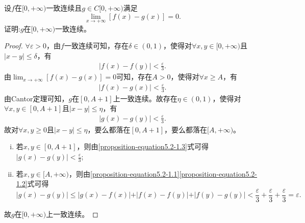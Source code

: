\documentclass[../../main.tex]{subfiles}
\begin{document}
\begin{proposition}\label{proposition:连续函数在无穷远处与一致连续极限相同则一定也一致连续}
设\(f\)在\([0,+\infty)\)一致连续且\(g\in C[0,+\infty)\)满足
\[
\lim_{x\rightarrow +\infty}[f(x)-g(x)] = 0.
\]
证明:\(g\)在\([0,+\infty)\)一致连续。
\end{proposition}
\begin{proof}
\(\forall \varepsilon > 0\)，由\(f\)一致连续可知，存在\(\delta \in (0, 1)\)，使得对\(\forall x, y \in [0, +\infty)\)且\(\vert x - y \vert \leq \delta\)，有
\begin{align}\label{proposition-equation5.2-1.1}
\vert f(x) - f(y) \vert < \frac{\varepsilon}{3}. 
\end{align}
由\(\lim_{x \to +\infty}[f(x) - g(x)] = 0\)可知，存在\(A > 0\)，使得对\(\forall x \geq A\)，有
\begin{align}\label{proposition-equation5.2-1.2}
\vert f(x) - g(x) \vert < \frac{\varepsilon}{3}.  
\end{align}
由Cantor定理可知，\(g\)在\([0, A + 1]\)上一致连续。故存在\(\eta \in (0, 1)\)，使得对\(\forall x, y \in [0, A + 1]\)且\(\vert x - y \vert \leq \eta\)，有
\begin{align}\label{proposition-equation5.2-1.3}
\vert g(x) - g(y) \vert < \frac{\varepsilon}{3}. 
\end{align}
故对\(\forall x, y \geq 0\)且\(\vert x - y \vert \leq \eta\)，要么都落在\([0, A + 1]\)，要么都落在\([A, +\infty)\)。
\begin{enumerate}[(i)]
\item 若\(x, y \in [0, A + 1]\)，则由\eqref{proposition-equation5.2-1.3}式可得\(\vert g(x) - g(y) \vert < \frac{\varepsilon}{3}\);
\item 若\(x, y \in [A, +\infty)\)，则由\eqref{proposition-equation5.2-1.1}\eqref{proposition-equation5.2-1.2}式可得
\[
\vert g(x) - g(y) \vert \leq \vert g(x) - f(x) \vert + \vert f(x) - f(y) \vert + \vert f(y) - g(y) \vert < \frac{\varepsilon}{3} + \frac{\varepsilon}{3} + \frac{\varepsilon}{3} = \varepsilon.
\]
\end{enumerate}
故\(g\)在\([0, +\infty)\)上一致连续。
\end{proof}
\end{document}
